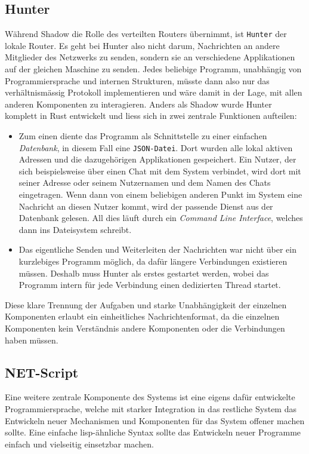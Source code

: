 \documentclass[a4paper,11pt,titlepage,twoside]{memoir}
\begin{document}
\subsection{Hunter}
\label{sec:org8dfcaca}
Während Shadow die Rolle des verteilten Routers übernimmt, ist \texttt{Hunter}
der lokale Router. Es geht bei Hunter also nicht darum, Nachrichten an
andere Mitglieder des Netzwerks zu senden, sondern sie an verschiedene
Applikationen auf der gleichen Maschine zu senden. Jedes beliebige
Programm, unabhängig von Programmiersprache und internen Strukturen,
müsste dann also nur das verhältnismässig Protokoll implementieren und
wäre damit in der Lage, mit allen anderen Komponenten zu interagieren.
Anders als Shadow wurde Hunter komplett in Rust entwickelt und liess
sich in zwei zentrale Funktionen aufteilen:
\begin{itemize}
\item Zum einen diente das Programm als Schnittstelle zu einer einfachen
\emph{Datenbank}, in diesem Fall eine \texttt{JSON-Datei}. Dort wurden alle lokal
aktiven Adressen und die dazugehörigen Applikationen gespeichert.
Ein Nutzer, der sich beispielsweise über einen Chat mit dem System
verbindet, wird dort mit seiner Adresse oder seinem Nutzernamen und
dem Namen des Chats eingetragen. Wenn dann von einem beliebigen
anderen Punkt im System eine Nachricht an diesen Nutzer kommt, wird
der passende Dienst aus der Datenbank gelesen. All dies läuft durch
ein \emph{Command Line Interface}, welches dann ins Dateisystem schreibt.
\item Das eigentliche Senden und Weiterleiten der Nachrichten war nicht
über ein kurzlebiges Programm möglich, da dafür längere Verbindungen
existieren müssen. Deshalb muss Hunter als erstes gestartet werden,
wobei das Programm intern für jede Verbindung einen dedizierten
Thread startet.
\end{itemize}

\noindent Diese klare Trennung der Aufgaben und starke Unabhängigkeit
der einzelnen Komponenten erlaubt ein einheitliches Nachrichtenformat,
da die einzelnen Komponenten kein Verständnis andere Komponenten oder
die Verbindungen haben müssen.
\subsection{NET-Script}
\label{sec:orgad7d625}
Eine weitere zentrale Komponente des Systems ist eine eigens dafür
entwickelte Programmiersprache, welche mit starker Integration in das
restliche System das Entwickeln neuer Mechanismen und Komponenten für
das System offener machen sollte. Eine einfache lisp-ähnliche Syntax
sollte das Entwickeln neuer Programme einfach und vielseitig
einsetzbar machen.
\end{document}
